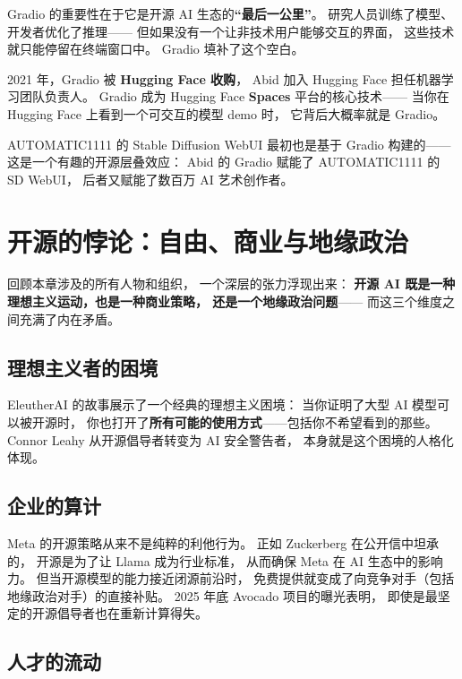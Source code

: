 Gradio 的重要性在于它是开源 AI 生态的\textbf{``最后一公里''}。
研究人员训练了模型、开发者优化了推理——
但如果没有一个让非技术用户能够交互的界面，
这些技术就只能停留在终端窗口中。
Gradio 填补了这个空白。

2021 年，Gradio 被 \textbf{Hugging Face 收购}，
Abid 加入 Hugging Face 担任机器学习团队负责人。
Gradio 成为 Hugging Face \textbf{Spaces} 平台的核心技术——
当你在 Hugging Face 上看到一个可交互的模型 demo 时，
它背后大概率就是 Gradio。

AUTOMATIC1111 的 Stable Diffusion WebUI 最初也是基于 Gradio 构建的——
这是一个有趣的开源层叠效应：
Abid 的 Gradio 赋能了 AUTOMATIC1111 的 SD WebUI，
后者又赋能了数百万 AI 艺术创作者。


\section{开源的悖论：自由、商业与地缘政治}
\label{sec:paradox}

回顾本章涉及的所有人物和组织，
一个深层的张力浮现出来：
\textbf{开源 AI 既是一种理想主义运动，也是一种商业策略，
还是一个地缘政治问题}——
而这三个维度之间充满了内在矛盾。

\subsection{理想主义者的困境}

EleutherAI 的故事展示了一个经典的理想主义困境：
当你证明了大型 AI 模型可以被开源时，
你也打开了\textbf{所有可能的使用方式}——包括你不希望看到的那些。
Connor Leahy 从开源倡导者转变为 AI 安全警告者，
本身就是这个困境的人格化体现。

\subsection{企业的算计}

Meta 的开源策略从来不是纯粹的利他行为。
正如 Zuckerberg 在公开信中坦承的，
开源是为了让 Llama 成为行业标准，
从而确保 Meta 在 AI 生态中的影响力。
但当开源模型的能力接近闭源前沿时，
免费提供就变成了向竞争对手（包括地缘政治对手）的直接补贴。
2025 年底 Avocado 项目的曝光表明，
即使是最坚定的开源倡导者也在重新计算得失。

\subsection{人才的流动}

